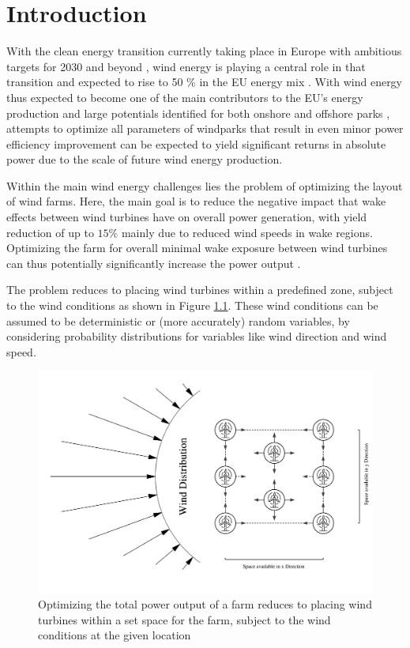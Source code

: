 
\chapter{Introduction}\label{chapter:introduction}


With the clean energy transition currently taking place in Europe with ambitious targets for 2030 and beyond \cite{EU_RE_Targets_2023}, wind energy is playing a central role in that transition and expected to rise to 50 \% in the EU energy mix \cite{ConsiliumEU_Harnessing_Wind_Power_2024}. 
With wind energy thus expected to become one of the main contributors to the EU's energy production and large potentials identified for both onshore and offshore parks \cite{EEA_Wind_Energy_Potential_2009}, attempts to optimize all parameters of windparks that result in even minor power efficiency improvement can be expected to yield significant returns in absolute power due to the scale of future wind energy production. 

Within the main wind energy challenges lies the problem of optimizing the layout of wind farms. Here, the main goal is to reduce the negative impact that wake effects between wind turbines have on overall power generation, with yield reduction of up to $15\%$  mainly due to reduced wind speeds in wake regions. Optimizing the farm for overall minimal wake exposure between wind turbines can thus potentially significantly increase the power output \cite{hou_review_2019,KIM2024123383}.

The problem reduces to placing wind turbines within a predefined zone, subject to the wind conditions as shown in Figure \ref{fig:intro_plot}. These wind conditions can be assumed to be deterministic or (more accurately) random variables, by considering probability distributions for variables like wind direction and wind speed.


\begin{figure}[h] 
	\centering
	\includegraphics[width=1\textwidth]{../figures/introduction/intro_plot.png} 
	\caption{Optimizing the total power output of a farm reduces to placing wind turbines within a set space for the farm, subject to the wind conditions at the given location}
	\label{fig:intro_plot}
\end{figure}

